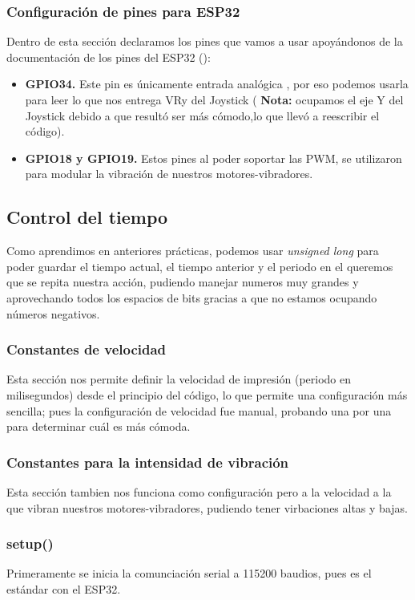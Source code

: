 \documentclass[conference]{IEEEtran}
\begin{document}
    \subsubsection{Configuración de pines para ESP32}
    Dentro de esta sección declaramos los pines que vamos a usar apoyándonos de la documentación de los pines del ESP32 (\cite{llamas_esp32_pinout_online}):
    \begin{itemize}
      \item \textbf{GPIO34.} Este pin es únicamente entrada analógica \cite{llamas_esp32_pinout_online}, por eso podemos usarla para leer lo que nos entrega VRy del Joystick ( \textbf{Nota:} ocupamos el eje Y del Joystick debido a que resultó ser más cómodo,lo que llevó a reescribir el código).
      \item \textbf{GPIO18 y GPIO19.} Estos pines al poder soportar las PWM, se utilizaron para modular la vibración de nuestros motores-vibradores.
    \end{itemize}

    \subsection{Control del tiempo}
    Como aprendimos en anteriores prácticas, podemos usar \textit{unsigned long} para poder guardar el tiempo actual, el tiempo anterior y el periodo en el queremos que se repita nuestra acción, pudiendo manejar numeros muy grandes y aprovechando todos los espacios de bits gracias a que no estamos ocupando números negativos.
    
    \subsubsection{Constantes de velocidad}
    Esta sección nos permite definir la velocidad de impresión (periodo en milisegundos) desde el principio del código, lo que permite una configuración más sencilla; pues la configuración de velocidad fue manual, probando una por una para determinar cuál es más cómoda.

    \subsubsection{Constantes para la intensidad de vibración}
    Esta sección tambien nos funciona como configuración pero a la velocidad a la que vibran nuestros motores-vibradores, pudiendo tener virbaciones altas y bajas.

  \subsubsection{setup()}
  Primeramente se inicia la comunciación serial a 115200 baudios, pues es el estándar con el ESP32.
\end{document}
